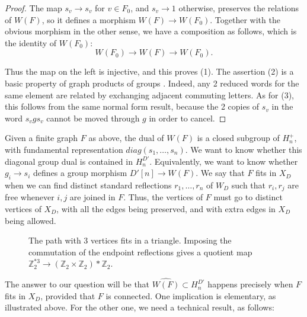 \documentclass[11pt,a4paper]{article}
\begin{document}
\begin{proof}
The map $s_v\to s_v$ for $v\in F_0$, and $s_v\to1$ otherwise, preserves the relations of $W(F)$, so it defines a morphism $W(F)\to W(F_0)$. Together with the obvious morphism in the other sense, we have a composition as follows, which is the identity of $W(F_0)$:
\[
 W(F_0)\to W(F)\to W(F_0).
\]

Thus the map on the left is injective, and this proves (1). The assertion (2) is a basic property of graph products of groups \cite{green}. Indeed, any 2 reduced words for the same element are related by exchanging adjacent commuting letters. As for (3), this follows from the same normal form result, because the 2 copies of $s_v$ in the word $s_vgs_v$ cannot be moved through $g$ in order to cancel.
\end{proof}

Given a finite graph $F$ as above, the dual of $W(F)$ is a closed subgroup of $H_n^+$, with fundamental representation $diag(s_1,\ldots,s_n)$. We want to know whether this diagonal group dual is contained in $H_n^{D'}$. Equivalently, we want to know whether $g_i\to s_i$ defines a group morphism $D'[n]\to W(F)$. We say that $F$ fits in $X_D$ when we can find distinct standard reflections $r_1,\ldots,r_n$ of $W_D$ such that $r_i,r_j$ are free whenever $i,j$ are joined in $F$. Thus, the vertices of $F$ must go to distinct vertices of $X_D$, with all the edges being preserved, and with extra edges in $X_D$ being allowed.

\begin{figure}[H]\centering
{}
\caption{The path with 3 vertices fits in a triangle. Imposing the commutation of the endpoint reflections gives a quotient map $\mathbb Z_2^{*3}\to(\mathbb Z_2\times\mathbb Z_2)*\mathbb Z_2$.}
\label{path-triangle}
\end{figure}

The answer to our question will be that $\widehat{W(F)}\subset H_n^{D'}$ happens precisely when $F$ fits in $X_D$, provided that $F$ is connected. One implication is elementary, as illustrated above. For the other one, we need a technical result, as follows:
\end{document}
